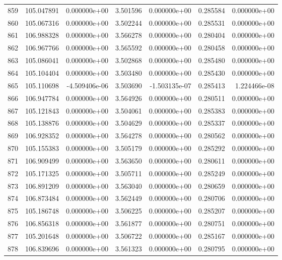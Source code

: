 \begin{tabular}{rrrrrrr}
 859 & 105.047891 &  0.000000e+00 &  3.501596 &  0.000000e+00 &    0.285584 &  0.000000e+00 \\
 860 & 105.067316 &  0.000000e+00 &  3.502244 &  0.000000e+00 &    0.285531 &  0.000000e+00 \\
 861 & 106.988328 &  0.000000e+00 &  3.566278 &  0.000000e+00 &    0.280404 &  0.000000e+00 \\
 862 & 106.967766 &  0.000000e+00 &  3.565592 &  0.000000e+00 &    0.280458 &  0.000000e+00 \\
 863 & 105.086041 &  0.000000e+00 &  3.502868 &  0.000000e+00 &    0.285480 &  0.000000e+00 \\
 864 & 105.104404 &  0.000000e+00 &  3.503480 &  0.000000e+00 &    0.285430 &  0.000000e+00 \\
 865 & 105.110698 & -4.509406e-06 &  3.503690 & -1.503135e-07 &    0.285413 &  1.224466e-08 \\
 866 & 106.947784 &  0.000000e+00 &  3.564926 &  0.000000e+00 &    0.280511 &  0.000000e+00 \\
 867 & 105.121843 &  0.000000e+00 &  3.504061 &  0.000000e+00 &    0.285383 &  0.000000e+00 \\
 868 & 105.138876 &  0.000000e+00 &  3.504629 &  0.000000e+00 &    0.285337 &  0.000000e+00 \\
 869 & 106.928352 &  0.000000e+00 &  3.564278 &  0.000000e+00 &    0.280562 &  0.000000e+00 \\
 870 & 105.155383 &  0.000000e+00 &  3.505179 &  0.000000e+00 &    0.285292 &  0.000000e+00 \\
 871 & 106.909499 &  0.000000e+00 &  3.563650 &  0.000000e+00 &    0.280611 &  0.000000e+00 \\
 872 & 105.171325 &  0.000000e+00 &  3.505711 &  0.000000e+00 &    0.285249 &  0.000000e+00 \\
 873 & 106.891209 &  0.000000e+00 &  3.563040 &  0.000000e+00 &    0.280659 &  0.000000e+00 \\
 874 & 106.873484 &  0.000000e+00 &  3.562449 &  0.000000e+00 &    0.280706 &  0.000000e+00 \\
 875 & 105.186748 &  0.000000e+00 &  3.506225 &  0.000000e+00 &    0.285207 &  0.000000e+00 \\
 876 & 106.856318 &  0.000000e+00 &  3.561877 &  0.000000e+00 &    0.280751 &  0.000000e+00 \\
 877 & 105.201648 &  0.000000e+00 &  3.506722 &  0.000000e+00 &    0.285167 &  0.000000e+00 \\
 878 & 106.839696 &  0.000000e+00 &  3.561323 &  0.000000e+00 &    0.280795 &  0.000000e+00 \\

\end{tabular}

